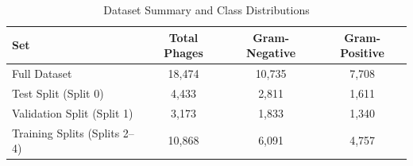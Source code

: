 
\begin{table}[htbp]
\centering
\begin{tabular}{lccc}
\toprule
\textbf{Set} & \textbf{Total Phages} & \textbf{Gram-Negative} & \textbf{Gram-Positive} \\
\midrule
Full Dataset & 18,474 & 10,735 & 7,708 \\
Test Split (Split 0) & 4,433 & 2,811 & 1,611 \\
Validation Split (Split 1) & 3,173 & 1,833 & 1,340 \\
Training Splits (Splits 2--4) & 10,868 & 6,091 & 4,757 \\
\bottomrule
\end{tabular}
\caption{Dataset Summary and Class Distributions}
\label{tab: dataset summary}
\end{table}

